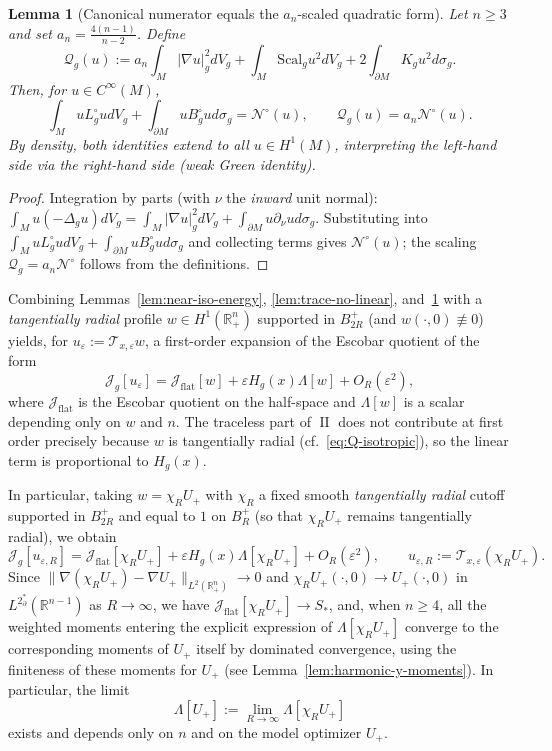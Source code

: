 \documentclass[11pt,reqno,a4paper]{amsart}
\newcommand{\R}{\mathbb{R}}
\DeclareMathOperator{\II}{II}
\numberwithin{equation}{section}
\theoremstyle{plain}
\newtheorem{lemma}[theorem]{Lemma}
\newcommand{\Scal}{\mathrm{Scal}}
\theoremstyle{remark}
\theoremstyle{plain}
\begin{document}
\begin{lemma}[Canonical numerator equals the $a_n$-scaled quadratic form]\label{lem:bridge-firstorder}
Let $n\ge 3$ and set $a_n=\frac{4(n-1)}{n-2}$. Define
\[
\mathcal Q_g(u):=a_n\int_M |\nabla u|_g^2dV_g
+ \int_M \Scal_gu^2dV_g
+ 2\int_{\partial M} K_gu^2d\sigma_g.
\]
Then, for $u\in C^\infty(M)$,
\[
\int_M u L_g^{\circ}udV_g+\int_{\partial M}u B_g^{\circ}ud\sigma_g
=\mathcal N^\circ(u),\qquad
\mathcal Q_g(u)=a_n\mathcal N^\circ(u).
\]
By density, both identities extend to all $u\in H^1(M)$, interpreting the left-hand side
via the right-hand side (weak Green identity).
\end{lemma}

\begin{proof}
Integration by parts (with $\nu$ the \emph{inward} unit normal): $\int_M u(-\Delta_g u)dV_g=\int_M|\nabla u|^2_gdV_g+\int_{\partial M}u\partial_\nu ud\sigma_g$.
Substituting into $\int_M uL_g^\circ udV_g+\int_{\partial M}uB_g^\circ ud\sigma_g$ and collecting terms gives $\mathcal N^\circ(u)$; the scaling $\mathcal Q_g=a_n\mathcal N^\circ$ follows from the definitions.
\end{proof}
Combining Lemmas~\ref{lem:near-iso-energy}, \ref{lem:trace-no-linear},
and~\ref{lem:bridge-firstorder} with a \emph{tangentially radial} profile
$w\in H^1(\R^n_+)$ supported in $B_{2R}^+$ (and $w(\cdot,0)\not\equiv 0$) yields,
for $u_\varepsilon:=\mathcal T_{x,\varepsilon}w$, a first-order expansion of the Escobar
quotient of the form
\[
\mathcal J_g[u_\varepsilon]
= \mathcal J_{\mathrm{flat}}[w]
+ \varepsilon H_g(x)\Lambda[w]
+ O_R(\varepsilon^2),
\]
where $\mathcal J_{\mathrm{flat}}$ is the Escobar quotient on the half-space and
$\Lambda[w]$ is a scalar depending only on $w$ and $n$. The traceless part of $\II$ does
not contribute at first order precisely because $w$ is tangentially radial
(cf.\ \eqref{eq:Q-isotropic}), so the linear term is proportional to $H_g(x)$.

In particular, taking $w=\chi_R U_+$ with $\chi_R$ a fixed smooth \emph{tangentially radial} cutoff
supported in $B_{2R}^+$ and equal to $1$ on $B_R^+$ (so that $\chi_R U_+$ remains tangentially radial), we obtain
\[
\mathcal J_g[u_{\varepsilon,R}]
= \mathcal J_{\mathrm{flat}}[\chi_R U_+]
+ \varepsilon H_g(x)\Lambda[\chi_R U_+]
+ O_R(\varepsilon^2),
\qquad
u_{\varepsilon,R}:=\mathcal T_{x,\varepsilon}(\chi_R U_+).
\]
Since $\|\nabla(\chi_R U_+)-\nabla U_+\|_{L^2(\R^n_+)}\to0$ and $\chi_R U_+(\cdot,0)\to U_+(\cdot,0)$ in
$L^{2^*_\partial}(\R^{n-1})$ as $R\to\infty$,
we have $\mathcal J_{\mathrm{flat}}[\chi_R U_+]\to S_\ast$, and, when $n\ge4$, all the
weighted moments entering the explicit expression of $\Lambda[\chi_R U_+]$ converge to the
corresponding moments of $U_+$ itself by dominated convergence, using the finiteness of
these moments for $U_+$ (see Lemma~\ref{lem:harmonic-y-moments}). In particular, the limit
\[
\Lambda[U_+]:=\lim_{R\to\infty}\Lambda[\chi_R U_+]
\]
exists and depends only on $n$ and on the model optimizer $U_+$.
\end{document}
